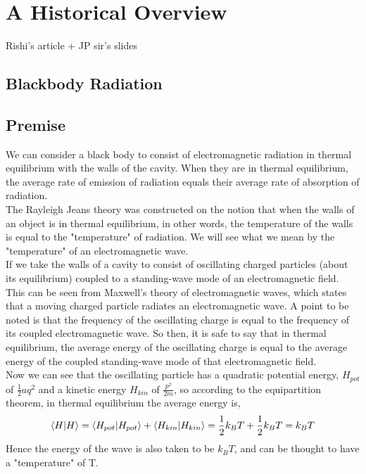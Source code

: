 \chapter{A Historical Overview}
Rishi's article + JP sir's slides
\section{Blackbody Radiation}
\section{Premise}
We can consider a black body to consist of electromagnetic radiation in thermal equilibrium with the walls of the cavity. When they are in thermal equilibrium, the average rate of emission of radiation equals their average rate of absorption of radiation. \\

\noindent The Rayleigh Jeans theory was constructed on the notion that when the walls of an object is in thermal equilibrium, in other words, the temperature of the walls is equal to the "temperature" of radiation. We will see what we mean by the "temperature" of an electromagnetic wave. \\

\noindent If we take the walls of a cavity to consist of oscillating charged particles (about its equilibrium) coupled to a standing-wave mode of an electromagnetic field. This can be seen from Maxwell's theory of electromagnetic waves, which states that a moving charged particle radiates an electromagnetic wave. A point to be noted is that the frequency of the oscillating charge is equal to the frequency of its coupled electromagnetic wave. So then, it is safe to say that in thermal equilibrium, the average energy of the oscillating charge is equal to the average energy of the coupled standing-wave mode of that electromagnetic field. \\

\noindent Now we can see that the oscillating particle has a quadratic potential energy, $H_{pot}$  of $\frac{1}{2}aq^2$ and a kinetic energy $H_{kin}$ of $\frac{p^2}{2m}$, so according to the equipartition theorem, in thermal equilibrium the average energy is,
\begin{equation}
	\braket{H}=\braket{H_{pot}}+\braket{H_{kin}}=\frac{1}{2}k_BT+\frac{1}{2}k_BT=k_BT
\end{equation}	
Hence the energy of the wave is also taken to be $k_BT$, and can be thought to have a "temperature" of T. \\

